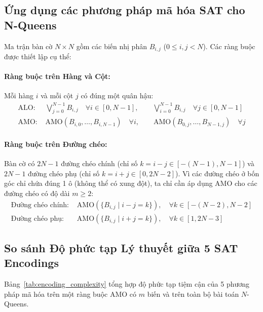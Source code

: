 \documentclass[a4paper,fleqn]{cas-sc}
\begin{document}
\subsection{Ứng dụng các phương pháp mã hóa SAT cho N-Queens}
\label{subsec:sat_encodings_nqueens}
Ma trận bàn cờ $N \times N$ gồm các biến nhị phân $B_{i,j}$ ($0 \le i, j < N$). Các ràng buộc được thiết lập cụ thể:

\paragraph{Ràng buộc trên Hàng và Cột:}
Mỗi hàng $i$ và mỗi cột $j$ có đúng một quân hậu:
\begin{align}
\text{ALO: } & \bigvee_{j=0}^{N-1} B_{i,j} \quad \forall i \in [0, N-1], \qquad \bigvee_{i=0}^{N-1} B_{i,j} \quad \forall j \in [0, N-1] \\
\text{AMO: } & \text{AMO}(B_{i,0}, \dots, B_{i,N-1}) \quad \forall i, \qquad \text{AMO}(B_{0,j}, \dots, B_{N-1,j}) \quad \forall j
\end{align}

\paragraph{Ràng buộc trên Đường chéo:}
Bàn cờ có $2N - 1$ đường chéo chính (chỉ số $k = i - j \in [-(N-1), N-1]$) và $2N - 1$ đường chéo phụ (chỉ số $k = i + j \in [0, 2N-2]$). Vì các đường chéo ở bốn góc chỉ chứa đúng 1 ô (không thể có xung đột), ta chỉ cần áp dụng AMO cho các đường chéo có độ dài $m \ge 2$:
\begin{align}
\text{Đường chéo chính: } & \text{AMO}(\{B_{i,j} \mid i - j = k\}), \quad \forall k \in [-(N-2), N-2] \\
\text{Đường chéo phụ: } & \text{AMO}(\{B_{i,j} \mid i + j = k\}), \quad \forall k \in [1, 2N-3]
\end{align}

\subsection{So sánh Độ phức tạp Lý thuyết giữa 5 SAT Encodings}
\label{subsec:complexity_comparison}
Bảng~\ref{tab:encoding_complexity} tổng hợp độ phức tạp tiệm cận của 5 phương pháp mã hóa trên một ràng buộc AMO có $m$ biến và trên toàn bộ bài toán $N$-Queens.
\end{document}
